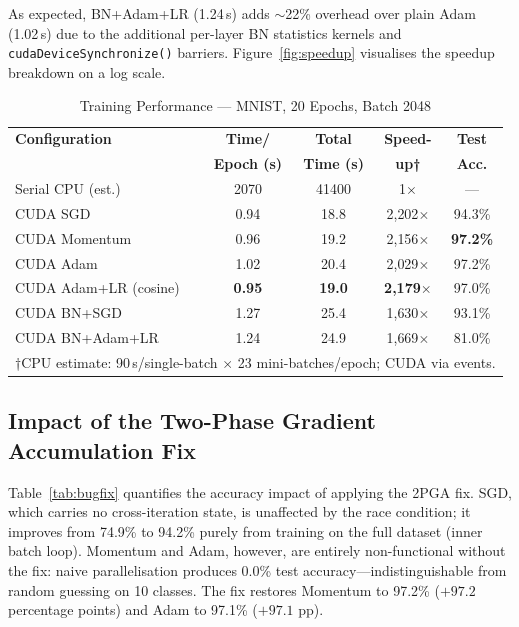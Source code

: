 \documentclass[conference]{IEEEtran}
\begin{document}
As expected, BN+Adam+LR (1.24\,s) adds $\sim$22\% overhead over plain Adam (1.02\,s) due to the additional per-layer BN statistics kernels and \texttt{cudaDeviceSynchronize()} barriers. Figure~\ref{fig:speedup} visualises the speedup breakdown on a log scale.

\begin{table}[htbp]
\caption{Training Performance — MNIST, 20 Epochs, Batch 2048}
\begin{center}
\begin{tabular}{lcccc}
\toprule
\textbf{Configuration} & \textbf{Time/} & \textbf{Total} & \textbf{Speed-} & \textbf{Test}\\
 & \textbf{Epoch (s)} & \textbf{Time (s)} & \textbf{up†} & \textbf{Acc.}\\
\midrule
Serial CPU (est.)     & 2070   & 41400 & 1$\times$ & — \\
CUDA SGD              & 0.94   &   18.8 & 2{,}202$\times$ & 94.3\% \\
CUDA Momentum         & 0.96   &   19.2 & 2{,}156$\times$ & \textbf{97.2\%} \\
CUDA Adam             & 1.02   &   20.4 & 2{,}029$\times$ & 97.2\% \\
CUDA Adam+LR (cosine) & \textbf{0.95} & \textbf{19.0} & \textbf{2{,}179$\times$} & 97.0\% \\
CUDA BN+SGD           & 1.27   &   25.4 & 1{,}630$\times$ & 93.1\% \\
CUDA BN+Adam+LR       & 1.24   &   24.9 & 1{,}669$\times$ & 81.0\% \\
\bottomrule
\multicolumn{5}{l}{\small †CPU estimate: 90\,s/single-batch $\times$ 23 mini-batches/epoch; CUDA via events.}\\
\end{tabular}
\label{tab:performance}
\end{center}
\end{table}

\subsection{Impact of the Two-Phase Gradient Accumulation Fix}

Table~\ref{tab:bugfix} quantifies the accuracy impact of applying the 2PGA fix. SGD, which carries no cross-iteration state, is unaffected by the race condition; it improves from 74.9\% to 94.2\% purely from training on the full dataset (inner batch loop). Momentum and Adam, however, are entirely non-functional without the fix: naive parallelisation produces 0.0\% test accuracy—indistinguishable from random guessing on 10 classes. The fix restores Momentum to 97.2\% ($+97.2$ percentage points) and Adam to 97.1\% ($+97.1$ pp).
\end{document}
